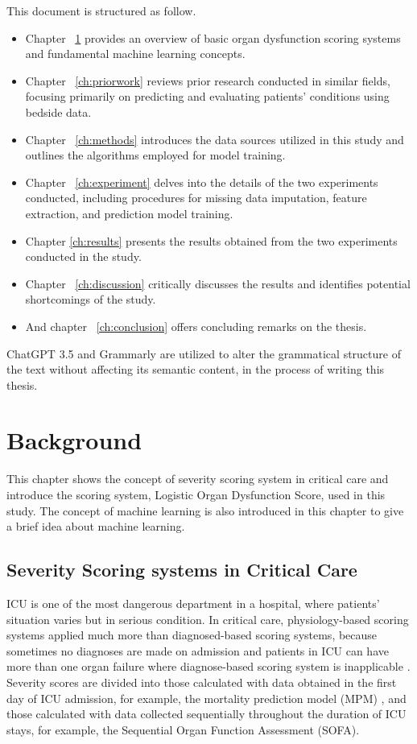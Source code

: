 \documentclass[12pt,a4paper,english
]{tunithesis}
\begin{document}
This document is structured as follow. 
\begin{itemize}
\item Chapter ~\ref{ch:background} provides an overview of basic organ dysfunction scoring systems and fundamental machine learning concepts.
\item Chapter ~\ref{ch:priorwork} reviews prior research conducted in similar fields, focusing primarily on predicting and evaluating patients' conditions using bedside data. 
\item Chapter ~\ref{ch:methods} introduces the data sources utilized in this study and outlines the algorithms employed for model training. 
\item Chapter ~\ref{ch:experiment} delves into the details of the two experiments conducted, including procedures for missing data imputation, feature extraction, and prediction model training.
\item Chapter \ref{ch:results} presents the results obtained from the two experiments conducted in the study.
\item Chapter ~\ref{ch:discussion} critically discusses the results and identifies potential shortcomings of the study.
\item And chapter ~\ref{ch:conclusion} offers concluding remarks on the thesis.
\end{itemize}

ChatGPT 3.5 and Grammarly are utilized to alter the grammatical structure of the text without affecting its semantic content, in the process of writing this thesis.

\chapter{Background}
\label{ch:background}
This chapter shows the concept of severity scoring system in critical care and introduce the scoring system, Logistic Organ Dysfunction Score, used in this study. The concept of machine learning is also introduced in this chapter to give a brief idea about machine learning.

\section{Severity Scoring systems in Critical Care}
ICU is one of the most dangerous department in a hospital, where patients' situation varies but in serious condition. In critical care, physiology-based scoring systems applied much more than diagnosed-based scoring systems, because sometimes no diagnoses are made on admission and patients in ICU can have more than one organ failure where diagnose-based scoring system is inapplicable \parencite{Bouch2008}. Severity scores are divided into those calculated with data obtained in the first day of ICU admission, for example, the mortality prediction model (MPM) \parencite{Lemeshow1993}, and those calculated with data collected sequentially throughout the duration of ICU stays, for example, the Sequential Organ Function Assessment (SOFA). 
\end{document}
